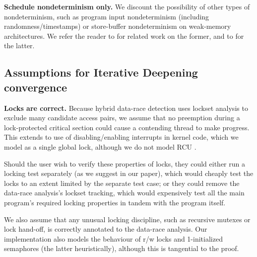 {\bf Schedule nondeterminism only.}
We discount the possibility of other types of nondeterminism,
such as program input nondeterminism (including randomness/timestamps) or
store-buffer nondeterminism on weak-memory architectures.
We refer the reader to \cite{klee,portend} for related work on the former, and to \cite{tsopso} for the latter.

\subsection{Assumptions for Iterative Deepening convergence}

{\bf Locks are correct.}
Because hybrid data-race detection uses lockset analysis to exclude many candidate access pairs,
we assume that no preemption during a lock-protected critical section could cause a contending thread to make progress.
This extends to use of disabling/enabling interrupts in kernel code, which we model as a single global lock,
although we do not model RCU \cite{rcu}.

Should the user wish to verify these properties of locks,
they could either run a locking test separately (as we suggest in our paper),
which would cheaply test the locks to an extent limited by the separate test case;
or they could remove the data-race analysis's lockset tracking,
which would expensively test all the main program's required locking properties in tandem with the program itself.

We also assume that any unusual locking discipline, such as recursive mutexes or lock hand-off,
is correctly annotated to the data-race analysis.
Our implementation also models the behaviour of r/w locks and 1-initialized semaphores (the latter heuristically),
although this is tangential to the proof.

%

